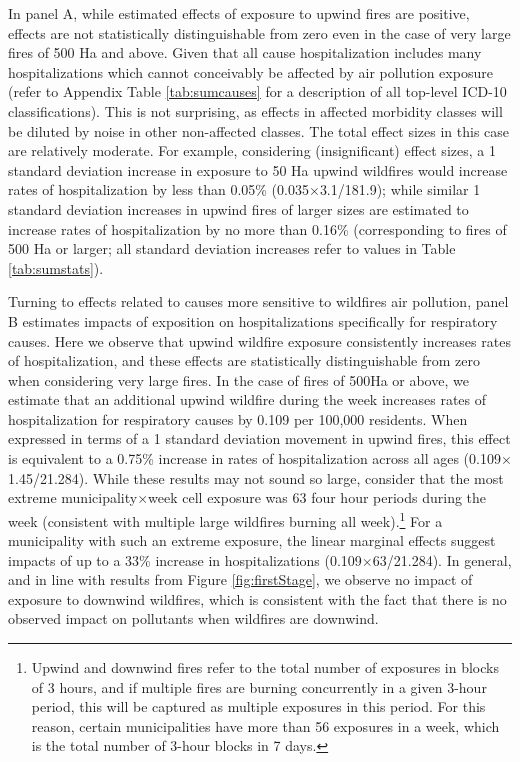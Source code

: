 \documentclass[11pt]{article}
\begin{document}
\begin{spacing}{1.5}
In panel A, while estimated effects of exposure to upwind fires are positive, effects are not statistically distinguishable from zero even in the case of very large fires of 500 Ha and above.  Given that all cause hospitalization includes many hospitalizations which cannot conceivably be affected by air pollution exposure (refer to Appendix Table \ref{tab:sumcauses} for a description of all top-level ICD-10 classifications). This is not surprising, as effects in affected morbidity classes will be diluted by noise in other non-affected classes. The total effect sizes in this case are relatively moderate.  For example, considering (insignificant) effect sizes, a 1 standard deviation increase in exposure to 50 Ha upwind wildfires would increase rates of hospitalization by less than 0.05\% (0.035$\times$3.1/181.9); while similar 1 standard deviation increases in upwind fires of larger sizes are estimated to increase rates of hospitalization by no more than 0.16\% (corresponding to fires of 500 Ha or larger; all standard deviation increases refer to values in Table \ref{tab:sumstats}).  

Turning to effects related to causes more sensitive to wildfires air pollution, panel B estimates impacts of exposition on hospitalizations specifically for respiratory causes.  Here we observe that upwind wildfire exposure consistently increases rates of hospitalization, and these effects are statistically distinguishable from zero when considering very large fires.  In the case of fires of 500Ha or above, we estimate that an additional upwind wildfire during the week increases rates of hospitalization for respiratory causes by 0.109 per 100,000 residents.  When expressed in terms of a 1 standard deviation movement in upwind fires, this effect is equivalent to a 0.75\% increase in rates of hospitalization across all ages (0.109$\times$1.45/21.284). While these results may not sound so large, consider that the most extreme municipality$\times$week cell exposure was 63 four hour periods during the week (consistent with multiple large wildfires burning all week).\footnote{Upwind and downwind fires refer to the total number of exposures in blocks of 3 hours, and if multiple fires are burning concurrently in a given 3-hour period, this will be captured as multiple exposures in this period.  For this reason, certain municipalities have more than 56 exposures in a week, which is the total number of 3-hour blocks in 7 days.}  For a municipality with such an extreme exposure, the linear marginal effects suggest impacts of up to a 33\% increase in hospitalizations (0.109$\times$63/21.284). In general, and in line with results from Figure \ref{fig:firstStage}, we observe no impact of exposure to downwind wildfires, which is consistent with the fact that there is no observed impact on pollutants when wildfires are downwind.




\end{spacing}
\end{document}
